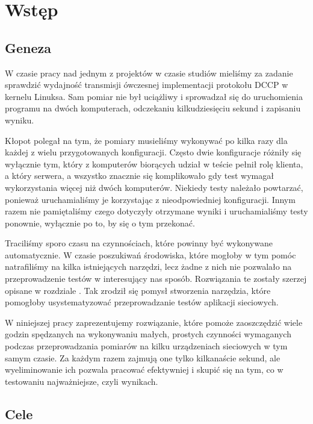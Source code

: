 \documentclass[00-praca-magisterska.tex]{subfiles}
\begin{document}
\chapter{Wstęp}

\section{Geneza}

W czasie pracy nad jednym z projektów w czasie studiów mieliśmy za zadanie
sprawdzić wydajność transmisji ówczesnej implementacji protokołu DCCP w kernelu
Linuksa.  Sam pomiar nie był uciążliwy i sprowadzał się do uruchomienia
programu na dwóch komputerach, odczekaniu kilkudziesięciu sekund i zapisaniu
wyniku.

Kłopot polegał na tym, że pomiary musieliśmy wykonywać po kilka razy dla
każdej z wielu przygotowanych konfiguracji. Często dwie konfiguracje różniły się
wyłącznie tym, który z komputerów biorących udział w teście pełnił rolę klienta,
a który serwera, a wszystko znacznie się komplikowało gdy test wymagał
wykorzystania więcej niż dwóch komputerów. Niekiedy testy należało powtarzać,
ponieważ uruchamialiśmy je korzystając z nieodpowiedniej konfiguracji. Innym
razem nie pamiętaliśmy czego dotyczyły otrzymane wyniki i uruchamialiśmy testy
ponownie, wyłącznie po to, by się o tym przekonać.

Traciliśmy sporo czasu na czynnościach, które powinny być wykonywane
automatycznie. W czasie poszukiwań środowiska, które mogłoby w tym pomóc
natrafiliśmy na kilka istniejących narzędzi, lecz żadne z nich nie pozwalało
na przeprowadzenie testów w interesujący nas sposób. Rozwiązania te zostały
szerzej opisane w rozdziale . Tak
zrodził się pomysł stworzenia narzędzia, które pomogłoby usystematyzować
przeprowadzanie testów aplikacji sieciowych.

W niniejszej pracy zaprezentujemy rozwiązanie, które pomoże zaoszczędzić wiele
godzin spędzanych na wykonywaniu małych, prostych czynności wymaganych podczas
przeprowadzania pomiarów na kilku urządzeniach sieciowych w tym samym czasie.
Za każdym razem zajmują one tylko kilkanaście sekund, ale wyeliminowanie ich
pozwala pracować efektywniej i skupić się na tym, co w testowaniu
najważniejsze, czyli wynikach.

\section{Cele}
\end{document}
